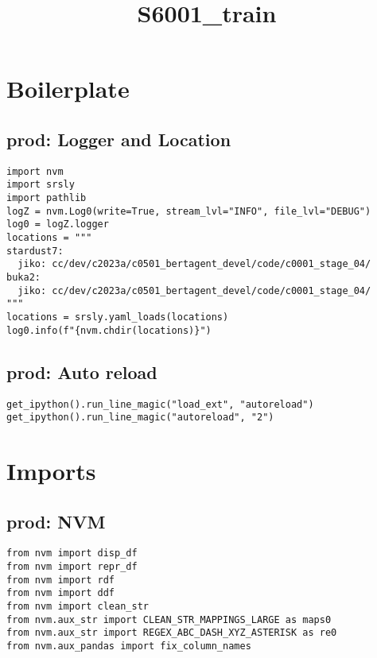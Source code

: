 \documentclass[a4paper,10pt,onecolumn,oneside,openright]{article}
\date{}
\title{S6001\_train}
\begin{document}
\maketitle

\section{Boilerplate}
\label{sec:orgd570195}
\subsection{prod: Logger and Location}
\label{sec:org2b64c1f}
\begin{verbatim}
import nvm
import srsly
import pathlib
logZ = nvm.Log0(write=True, stream_lvl="INFO", file_lvl="DEBUG")
log0 = logZ.logger
locations = """
stardust7:
  jiko: cc/dev/c2023a/c0501_bertagent_devel/code/c0001_stage_04/
buka2:
  jiko: cc/dev/c2023a/c0501_bertagent_devel/code/c0001_stage_04/
"""
locations = srsly.yaml_loads(locations)
log0.info(f"{nvm.chdir(locations)}")
\end{verbatim}

\subsection{prod: Auto reload}
\label{sec:org5ddb20a}
\begin{verbatim}
get_ipython().run_line_magic("load_ext", "autoreload")
get_ipython().run_line_magic("autoreload", "2")
\end{verbatim}

\section{Imports}
\label{sec:org73d7e8e}
\subsection{prod: NVM}
\label{sec:orgdc0bedd}
\begin{verbatim}
from nvm import disp_df
from nvm import repr_df
from nvm import rdf
from nvm import ddf
from nvm import clean_str
from nvm.aux_str import CLEAN_STR_MAPPINGS_LARGE as maps0
from nvm.aux_str import REGEX_ABC_DASH_XYZ_ASTERISK as re0
from nvm.aux_pandas import fix_column_names
\end{verbatim}
\end{document}
